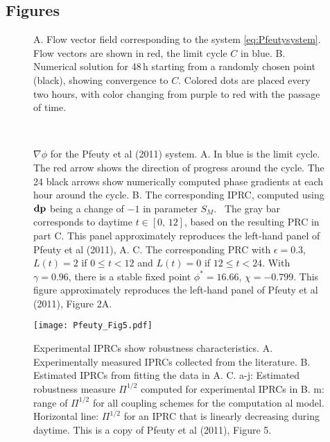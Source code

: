 \subsection{Figures}
\renewcommand{\thesubfigure}{\Alph{subfigure}.}
\vspace{-.5cm}
\begin{figure}[h!]
\centering
{}
\caption{A. Flow vector field corresponding to the system
  \eqref{eq:Pfeutysystem}. Flow vectors are shown in red, the limit cycle $C$ in
  blue. 
  B. Numerical solution for 48\,h starting from a randomly chosen
  point (black), showing convergence to $C$. Colored dots are placed
  every two hours, with color changing from purple to red with the passage of time. }
\label{fig:LA1}%
\end{figure}

\begin{figure}[h!]
\centering
\begin{minipage}{.45\linewidth}
\end{minipage}~\begin{minipage}{.32\linewidth}
\end{minipage}
\caption{
$\nabla\phi$ for the Pfeuty et al (2011) system.
A. In blue is the limit cycle. The red arrow shows the direction of
progress around the cycle. The 24 black arrows show numerically
computed phase gradients at each hour around the cycle. B. The
corresponding IPRC, computed using $\vb{dp}$ being a change of 
$-1$ in parameter ${S}_{M}$. \ The gray bar corresponds to daytime 
$t{\in}[0,\,12]$, based on the resulting PRC in part C. This panel
approximately reproduces the left-hand panel of Pfeuty et al (2011),
A. C. The corresponding PRC with $\epsilon=0.3$, 
$L(t)=2$ if $0{\leq}t{<}12$ and $L(t)=0$ if $12{\leq}t{<}24$. 
With $\gamma =0.96$, there is a stable fixed point 
$\phi^{*}=16.66$, $\chi=-0.799$. This figure approximately reproduces the 
left-hand panel of Pfeuty et al (2011), Figure 2A.
}
\label{fig:LA2}
\end{figure}

\begin{figure}
\centerline{
\texttt{[image: Pfeuty\_Fig5.pdf]}
}\caption{Experimental IPRCs
show robustness characteristics.
A. Experimentally measured IPRCs collected from the literature. B.
Estimated IPRCs from fitting the data in A. C. a-j: Estimated
robustness measure $\varPi^{1/2}$ computed for experimental IPRCs in
B. m: range of $\varPi^{1/2}$ for all coupling schemes for the
computation al model. Horizontal line: $\varPi^{1/2}$ for an IPRC
that is linearly decreasing during daytime.
This is a copy of Pfeuty et al (2011), Figure 5.
}
\label{fig:Pfeuty5}
\end{figure}

\clearpage








